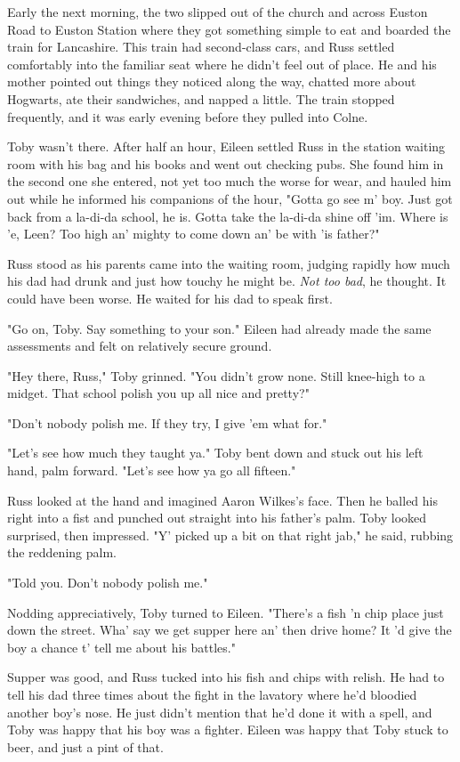Early the next morning, the two slipped out of the church and across Euston Road to Euston Station where they got something simple to eat and boarded the train for Lancashire. This train had second-class cars, and Russ settled comfortably into the familiar seat where he didn't feel out of place. He and his mother pointed out things they noticed along the way, chatted more about Hogwarts, ate their sandwiches, and napped a little. The train stopped frequently, and it was early evening before they pulled into Colne.

Toby wasn't there. After half an hour, Eileen settled Russ in the station waiting room with his bag and his books and went out checking pubs. She found him in the second one she entered, not yet too much the worse for wear, and hauled him out while he informed his companions of the hour, "Gotta go see m' boy. Just got back from a la-di-da school, he is. Gotta take the la-di-da shine off 'im. Where is 'e, Leen? Too high an' mighty to come down an' be with 'is father?"

Russ stood as his parents came into the waiting room, judging rapidly how much his dad had drunk and just how touchy he might be. \emph{Not too bad}, he thought. It could have been worse. He waited for his dad to speak first.

"Go on, Toby. Say something to your son." Eileen had already made the same assessments and felt on relatively secure ground.

"Hey there, Russ," Toby grinned. "You didn't grow none. Still knee-high to a midget. That school polish you up all nice and pretty?"

"Don't nobody polish me. If they try, I give 'em what for."

"Let's see how much they taught ya." Toby bent down and stuck out his left hand, palm forward. "Let's see how ya go all fifteen."

Russ looked at the hand and imagined Aaron Wilkes's face. Then he balled his right into a fist and punched out straight into his father's palm. Toby looked surprised, then impressed. "Y' picked up a bit on that right jab," he said, rubbing the reddening palm.

"Told you. Don't nobody polish me."

Nodding appreciatively, Toby turned to Eileen. "There's a fish 'n chip place just down the street. Wha' say we get supper here an' then drive home? It 'd give the boy a chance t' tell me about his battles."

Supper was good, and Russ tucked into his fish and chips with relish. He had to tell his dad three times about the fight in the lavatory where he'd bloodied another boy's nose. He just didn't mention that he'd done it with a spell, and Toby was happy that his boy was a fighter. Eileen was happy that Toby stuck to beer, and just a pint of that.

